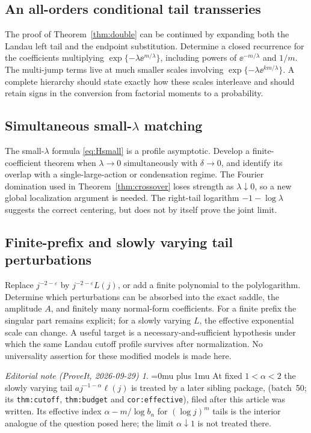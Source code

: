 \documentclass[11pt,a4paper]{article}
\numberwithin{equation}{section}
\theoremstyle{definition}
\theoremstyle{remark}
\newtheorem*{ednoteinner}{Editorial note (ProveIt, 2026-09-29)}
\newenvironment{ednote}{\begin{ednoteinner}\sloppy\Urlmuskip=0mu plus 1mu\relax}{\end{ednoteinner}}
\newcommand{\ep}{\varepsilon}\newcommand{\la}{\lambda}
\begin{document}
\subsection{An all-orders conditional tail transseries}
The proof of Theorem~\ref{thm:double} can be continued by expanding both
the Landau left tail and the endpoint substitution. Determine a closed
recurrence for the coefficients multiplying
\(\exp\{-\la\ee^{m/\la}\}\), including powers of \(\ee^{-m/\la}\) and
\(1/m\). The multi-jump terms live at much smaller scales involving
\(\exp\{-\la\ee^{km/\la}\}\). A complete hierarchy should state exactly
how these scales interleave and should retain signs in the conversion
from factorial moments to a probability.

\subsection{Simultaneous small-\texorpdfstring{\(\la\)}{lambda} matching}
The small-\(\la\) formula \eqref{eq:Hsmall} is a profile asymptotic.
Develop a finite-coefficient theorem when \(\la\to0\) simultaneously
with \(\delta\to0\), and identify its overlap with a single-large-action
or condensation regime. The Fourier domination used in
Theorem~\ref{thm:crossover} loses strength as \(\la\downarrow0\), so a
new global localization argument is needed. The right-tail logarithm
\(-1-\log\la\) suggests the correct centering, but does not by itself
prove the joint limit.

\subsection{Finite-prefix and slowly varying tail perturbations}
Replace \(j^{-2-\ep}\) by \(j^{-2-\ep}L(j)\), or add a finite
polynomial to the polylogarithm. Determine which perturbations can be
absorbed into the exact saddle, the amplitude \(A\), and finitely many
normal-form coefficients. For a finite prefix the singular part remains
explicit; for a slowly varying \(L\), the effective exponential scale
can change. A useful target is a necessary-and-sufficient hypothesis
under which the same Landau cutoff profile survives after normalization.
No universality assertion for these modified models is made here.
\begin{ednote}
At fixed \(1<\alpha<2\) the slowly varying tail
\(a j^{-1-\alpha}\ell(j)\) is treated by a later sibling package,
 (batch~50; its
\texttt{thm:cutoff}, \texttt{thm:budget} and \texttt{cor:effective}),
filed after this article was written. Its effective index
\(\alpha-m/\log b_n\) for \((\log j)^m\) tails is the interior analogue of
the question posed here; the limit \(\alpha\downarrow1\) is not treated
there.
\end{ednote}
\end{document}

